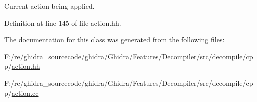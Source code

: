 Current action being applied. 



Definition at line 145 of file action.\+hh.



The documentation for this class was generated from the following files\+:\begin{DoxyCompactItemize}
\item 
F\+:/re/ghidra\+\_\+sourcecode/ghidra/\+Ghidra/\+Features/\+Decompiler/src/decompile/cpp/\mbox{\hyperlink{action_8hh}{action.\+hh}}\item 
F\+:/re/ghidra\+\_\+sourcecode/ghidra/\+Ghidra/\+Features/\+Decompiler/src/decompile/cpp/\mbox{\hyperlink{action_8cc}{action.\+cc}}\end{DoxyCompactItemize}
